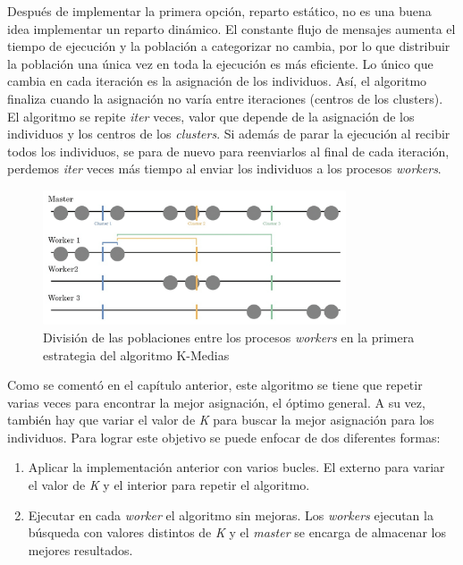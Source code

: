 	
		
		Después de implementar la primera opción, reparto estático, no es una buena idea implementar un reparto dinámico. El constante flujo de mensajes aumenta el tiempo de ejecución y la población a categorizar no cambia, por lo que distribuir la población una única vez en toda la ejecución es más eficiente. Lo único que cambia en cada iteración es la asignación de los individuos. Así, el algoritmo finaliza cuando la asignación no varía entre iteraciones (centros de los clusters). El algoritmo se repite \textit{iter} veces, valor que depende de la asignación de los individuos y los centros de los \textit{clusters}. Si además de parar la ejecución al recibir todos los individuos, se para de nuevo para reenviarlos al final de cada iteración, perdemos \textit{iter} veces más tiempo al enviar los individuos a los procesos \textit{workers}. 
		
		
		\begin{figure} [!h]
			\centering
			\includegraphics[width=0.8\textwidth]{images/chapter_3/kmedias_mpi}	
			\caption{División de las poblaciones entre los procesos \textit{workers} en la primera estrategia del algoritmo K-Medias}
			\label{fig:kmediasdiv}
		\end{figure}
		
		
		
		Como se comentó en el capítulo anterior, este algoritmo se tiene que repetir varias veces para encontrar la mejor asignación, el óptimo general. A su vez, también hay que variar el valor de \textit{K} para buscar la mejor asignación para los individuos. Para lograr este objetivo se puede enfocar de dos diferentes formas:
		
		\begin{enumerate}
			\item Aplicar la implementación anterior con varios bucles. El externo para variar el valor de \textit{K} y el interior para repetir el algoritmo.
			\item Ejecutar en cada \textit{worker} el algoritmo sin mejoras. Los \textit{workers} ejecutan la búsqueda con valores distintos de \textit{K} y el \textit{master} se encarga de almacenar los mejores resultados.
		\end{enumerate}
		

